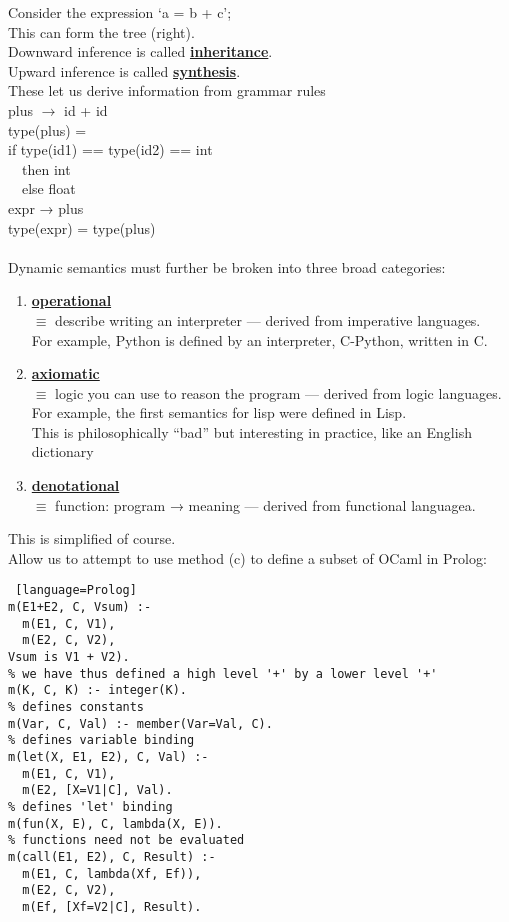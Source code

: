 \documentclass[../../lecture_notes.tex]{subfiles}
\begin{document}
Consider the expression ‘a = b + c’;\\
\indent This can form the tree (right).\\
Downward inference is called \textbf{\underline{inheritance}}.\\
Upward inference is called \textbf{\underline{synthesis}}.\\
These let us derive information from grammar rules\\
\indent plus $\rightarrow$ id + id\\
\indent \indent type(plus) = \\
\indent \indent \indent if type(id1) == type(id2) == int\\
\indent \indent \indent \ \ then int\\
\indent \indent \indent \ \ else float\\
\indent expr → plus\\
 \indent \indent type(expr) = type(plus)\\
\\ 
 Dynamic semantics must further be broken into three broad categories:
 \begin{enumerate} [itemsep=0mm]
	\item \textbf{\underline{operational}}\\
		$\equiv$ describe writing an interpreter — derived from imperative languages.\\
		For example, Python is defined by an interpreter, C-Python, written in C.
	\item \textbf{\underline{axiomatic}}\\
		$\equiv$ logic you can use to reason the program — derived from logic languages.\\
		For example, the first semantics for lisp were defined in Lisp.\\
		This is philosophically “bad” but interesting in practice, like an English dictionary
	\item \textbf{\underline{denotational}}\\
		$\equiv$ function: program → meaning — derived from functional languagea.
\end{enumerate}
\noindent This is simplified of course.
\\
Allow us to attempt to use method (c) to define a subset of OCaml in Prolog:\\
\begin{lstlisting} [language=Prolog]
m(E1+E2, C, Vsum) :-
  m(E1, C, V1),
  m(E2, C, V2),
Vsum is V1 + V2).
% we have thus defined a high level '+' by a lower level '+'
m(K, C, K) :- integer(K).
% defines constants
m(Var, C, Val) :- member(Var=Val, C).
% defines variable binding
m(let(X, E1, E2), C, Val) :-
  m(E1, C, V1),
  m(E2, [X=V1|C], Val).
% defines 'let' binding
m(fun(X, E), C, lambda(X, E)).
% functions need not be evaluated
m(call(E1, E2), C, Result) :-
  m(E1, C, lambda(Xf, Ef)),
  m(E2, C, V2),
  m(Ef, [Xf=V2|C], Result).
\end{lstlisting}
\end{document}
